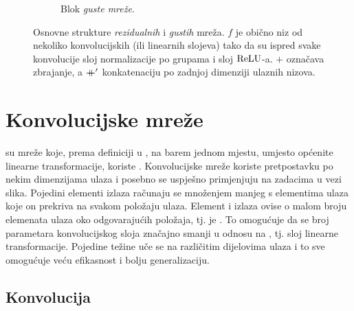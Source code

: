 \documentclass[utf8, diplomski, lmodern]{fer}
\begin{document}
\begin{figure}
\begin{subfigure}[t]{1\textwidth}
		\caption{Blok \textit{guste mreže}.}
		\label{subfig:densenet}
	\end{subfigure}
	\caption{Osnovne strukture \textit{rezidualnih} i \textit{gustih} mreža. $f$ je obično niz od nekoliko konvolucijskih (ili linearnih slojeva) tako da su ispred svake konvolucije sloj normalizacije po grupama i sloj $\operatorname{ReLU}$-a. $+$ označava zbrajanje, a $\mathbin{+\mkern-10mu+}'$ konkatenaciju po zadnjoj dimenziji ulaznih nizova.}
	\label{fig:resnet-densenet}
\end{figure}


\section{Konvolucijske mreže}

 su mreže koje, prema definiciji u \citet{Goodfellow:2016:DL}, na barem jednom mjestu, umjesto općenite linearne transformacije, koriste . Konvolucijske mreže koriste pretpostavku  po nekim dimenzijama ulaza i posebno se uspješno primjenjuju na zadacima u vezi slika. Pojedini elementi izlaza  računaju se množenjem manjeg  s elementima ulaza koje on prekriva na svakom položaju ulaza. Element i izlaza ovise o malom broju elemenata ulaza oko odgovarajućih položaja, tj.  je . To omogućuje da se broj parametara konvolucijskog sloja značajno smanji u odnosu na , tj. sloj linearne transformacije. Pojedine težine uče se na različitim dijelovima ulaza i to sve omogućuje veću efikasnost i bolju generalizaciju.

\subsection{Konvolucija}
\end{document}
